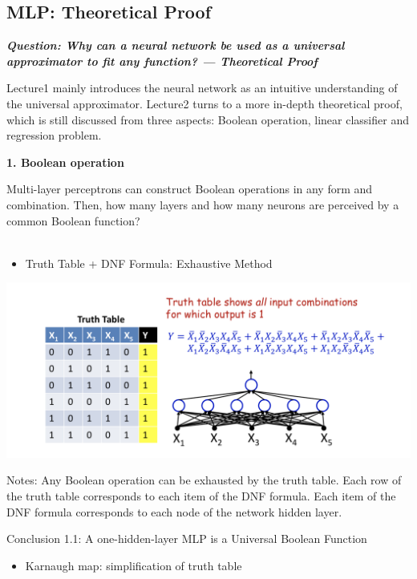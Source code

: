 \documentclass{article}
\begin{document}
		
	\subsection{MLP: Theoretical Proof}
	
	
	\textbf{\textit{Question: Why can a neural network be used as a universal approximator to fit any function? --- Theoretical Proof}}
	
	Lecture1 mainly introduces the neural network as an intuitive understanding of the universal approximator. Lecture2 turns to a more in-depth theoretical proof, which is still discussed from three aspects: Boolean operation, linear classifier and regression problem.
	
	
	\textbf{1. Boolean operation}
	
	Multi-layer perceptrons can construct Boolean operations in any form and combination. Then, how many layers and how many neurons are perceived by a common Boolean function? \\ \\
		
		\begin{itemize}
			\item Truth Table + DNF Formula: Exhaustive Method
		\end{itemize}
	
	\includegraphics[scale=0.2]{14.png}
	
	Notes: Any Boolean operation can be exhausted by the truth table. Each row of the truth table corresponds to each item of the DNF formula. Each item of the DNF formula corresponds to each node of the network hidden layer.
	
	Conclusion 1.1: A one-hidden-layer MLP is a Universal Boolean Function
		
	
		\begin{itemize}
			\item Karnaugh map: simplification of truth table
		\end{itemize}
	
\end{document}
